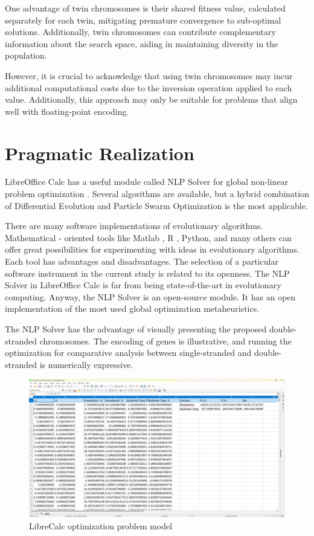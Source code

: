 \documentclass[runningheads]{llncs}
\begin{document}
One advantage of twin chromosomes is their shared fitness value, calculated separately for each twin, mitigating premature convergence to sub-optimal solutions. Additionally, twin chromosomes can contribute complementary information about the search space, aiding in maintaining diversity in the population.

However, it is crucial to acknowledge that using twin chromosomes may incur additional computational costs due to the inversion operation applied to each value. Additionally, this approach may only be suitable for problems that align well with floating-point encoding.

\section{Pragmatic Realization}

LibreOffice Calc has a useful module called NLP Solver for global non-linear problem optimization \cite{Tomov-2021}. Several algorithms are available, but a hybrid combination of Differential Evolution and Particle Swarm Optimization is the most applicable.

There are many software implementations of evolutionary algorithms. Mathematical - oriented tools like Matlab \cite{Fiala-2013}, R \cite{Nash-2014}, Python\cite{Beck-2023}, and many others can offer great possibilities for experimenting with ideas in evolutionary algorithms. Each tool has advantages and disadvantages. The selection of a particular software instrument in the current study is related to its openness. The NLP Solver in LibreOffice Calc is far from being state-of-the-art in evolutionary computing. Anyway, the NLP Solver is an open-source module. It has an open implementation of the most used global optimization metaheuristics. 

The NLP Solver has the advantage of visually presenting the proposed double-stranded chromosomes. The encoding of genes is illustrative, and running the optimization for comparative analysis between single-stranded and double-stranded is numerically expressive.

\begin{figure}[h]
\includegraphics[width=\textwidth]{fig1.png}
\caption{LibreCalc optimization problem model} \label{fig1}
\end{figure}
\end{document}

